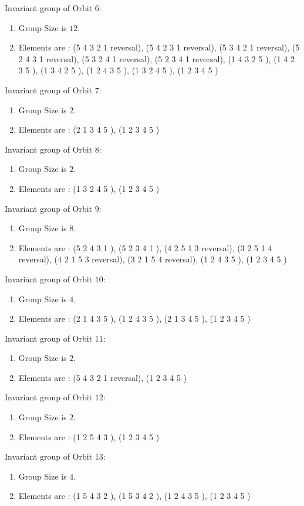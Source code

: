 \documentclass[12pt]{article}
\begin{document}
Invariant group of Orbit $6$:
\begin{enumerate}
\item Group Size is $12$.
\item Elements are : (5 4 3 2 1   reversal), (5 4 2 3 1   reversal), (5 3 4 2 1   reversal), (5 2 4 3 1   reversal), (5 3 2 4 1   reversal), (5 2 3 4 1   reversal), (1 4 3 2 5  ), (1 4 2 3 5  ), (1 3 4 2 5  ), (1 2 4 3 5  ), (1 3 2 4 5  ), (1 2 3 4 5  )
\end{enumerate}
Invariant group of Orbit $7$:
\begin{enumerate}
\item Group Size is $2$.
\item Elements are : (2 1 3 4 5  ), (1 2 3 4 5  )
\end{enumerate}
Invariant group of Orbit $8$:
\begin{enumerate}
\item Group Size is $2$.
\item Elements are : (1 3 2 4 5  ), (1 2 3 4 5  )
\end{enumerate}
Invariant group of Orbit $9$:
\begin{enumerate}
\item Group Size is $8$.
\item Elements are : (5 2 4 3 1  ), (5 2 3 4 1  ), (4 2 5 1 3   reversal), (3 2 5 1 4   reversal), (4 2 1 5 3   reversal), (3 2 1 5 4   reversal), (1 2 4 3 5  ), (1 2 3 4 5  )
\end{enumerate}
Invariant group of Orbit $10$:
\begin{enumerate}
\item Group Size is $4$.
\item Elements are : (2 1 4 3 5  ), (1 2 4 3 5  ), (2 1 3 4 5  ), (1 2 3 4 5  )
\end{enumerate}
Invariant group of Orbit $11$:
\begin{enumerate}
\item Group Size is $2$.
\item Elements are : (5 4 3 2 1   reversal), (1 2 3 4 5  )
\end{enumerate}
Invariant group of Orbit $12$:
\begin{enumerate}
\item Group Size is $2$.
\item Elements are : (1 2 5 4 3  ), (1 2 3 4 5  )
\end{enumerate}
Invariant group of Orbit $13$:
\begin{enumerate}
\item Group Size is $4$.
\item Elements are : (1 5 4 3 2  ), (1 5 3 4 2  ), (1 2 4 3 5  ), (1 2 3 4 5  )
\end{enumerate}
\end{document}
